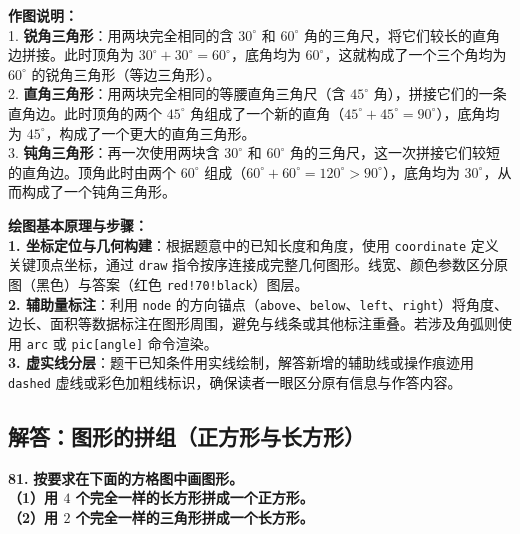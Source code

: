 \vspace{0.6cm}
{\small\color{gray}
\textbf{作图说明：}\\
1. \textbf{锐角三角形}：用两块完全相同的含 $30^\circ$ 和 $60^\circ$ 角的三角尺，将它们较长的直角边拼接。此时顶角为 $30^\circ + 30^\circ = 60^\circ$，底角均为 $60^\circ$，这就构成了一个三个角均为 $60^\circ$ 的锐角三角形（等边三角形）。\\
2. \textbf{直角三角形}：用两块完全相同的等腰直角三角尺（含 $45^\circ$ 角），拼接它们的一条直角边。此时顶角的两个 $45^\circ$ 角组成了一个新的直角（$45^\circ + 45^\circ = 90^\circ$），底角均为 $45^\circ$，构成了一个更大的直角三角形。\\
3. \textbf{钝角三角形}：再一次使用两块含 $30^\circ$ 和 $60^\circ$ 角的三角尺，这一次拼接它们较短的直角边。顶角此时由两个 $60^\circ$ 组成（$60^\circ + 60^\circ = 120^\circ>90^\circ$），底角均为 $30^\circ$，从而构成了一个钝角三角形。
}

\vspace{0.8cm}


\vspace{0.6cm}

{\small\color{blue!70!black}
\textbf{绘图基本原理与步骤：}\\
\textbf{1. 坐标定位与几何构建}：根据题意中的已知长度和角度，使用 \texttt{coordinate} 定义关键顶点坐标，通过 \texttt{draw} 指令按序连接成完整几何图形。线宽、颜色参数区分原图（黑色）与答案（红色 \texttt{red!70!black}）图层。\\
\textbf{2. 辅助量标注}：利用 \texttt{node} 的方向锚点（\texttt{above}、\texttt{below}、\texttt{left}、\texttt{right}）将角度、边长、面积等数据标注在图形周围，避免与线条或其他标注重叠。若涉及角弧则使用 \texttt{arc} 或 \texttt{pic[angle]} 命令渲染。\\
\textbf{3. 虚实线分层}：题干已知条件用实线绘制，解答新增的辅助线或操作痕迹用 \texttt{dashed} 虚线或彩色加粗线标识，确保读者一眼区分原有信息与作答内容。
}

\newpage

\newpage

\subsection{解答：图形的拼组（正方形与长方形）}

\vspace{0.6cm}

\textbf{\LARGE 81.} \textbf{按要求在下面的方格图中画图形。\\[1ex]
（1）用 $4$ 个完全一样的长方形拼成一个正方形。\\[1ex]
（2）用 $2$ 个完全一样的三角形拼成一个长方形。}

